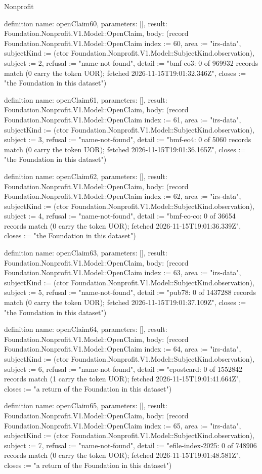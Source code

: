 \begin{lexlean}{Nonprofit}
\begin{semanticmodule}
definition{
  name: openClaim60,
  parameters: [],
  result: Foundation.Nonprofit.V1.Model::OpenClaim,
  body: (record Foundation.Nonprofit.V1.Model::OpenClaim {index := 60, area := "irs-data", subjectKind := (ctor Foundation.Nonprofit.V1.Model::SubjectKind.observation), subject := 2, refusal := "name-not-found", detail := "bmf-eo3: 0 of 969932 records match (0 carry the token UOR); fetched 2026-11-15T19:01:32.346Z", closes := "the Foundation in this dataset"})
}

definition{
  name: openClaim61,
  parameters: [],
  result: Foundation.Nonprofit.V1.Model::OpenClaim,
  body: (record Foundation.Nonprofit.V1.Model::OpenClaim {index := 61, area := "irs-data", subjectKind := (ctor Foundation.Nonprofit.V1.Model::SubjectKind.observation), subject := 3, refusal := "name-not-found", detail := "bmf-eo4: 0 of 5060 records match (0 carry the token UOR); fetched 2026-11-15T19:01:36.165Z", closes := "the Foundation in this dataset"})
}

definition{
  name: openClaim62,
  parameters: [],
  result: Foundation.Nonprofit.V1.Model::OpenClaim,
  body: (record Foundation.Nonprofit.V1.Model::OpenClaim {index := 62, area := "irs-data", subjectKind := (ctor Foundation.Nonprofit.V1.Model::SubjectKind.observation), subject := 4, refusal := "name-not-found", detail := "bmf-eo-co: 0 of 36654 records match (0 carry the token UOR); fetched 2026-11-15T19:01:36.339Z", closes := "the Foundation in this dataset"})
}

definition{
  name: openClaim63,
  parameters: [],
  result: Foundation.Nonprofit.V1.Model::OpenClaim,
  body: (record Foundation.Nonprofit.V1.Model::OpenClaim {index := 63, area := "irs-data", subjectKind := (ctor Foundation.Nonprofit.V1.Model::SubjectKind.observation), subject := 5, refusal := "name-not-found", detail := "pub78: 0 of 1437288 records match (0 carry the token UOR); fetched 2026-11-15T19:01:37.109Z", closes := "the Foundation in this dataset"})
}

definition{
  name: openClaim64,
  parameters: [],
  result: Foundation.Nonprofit.V1.Model::OpenClaim,
  body: (record Foundation.Nonprofit.V1.Model::OpenClaim {index := 64, area := "irs-data", subjectKind := (ctor Foundation.Nonprofit.V1.Model::SubjectKind.observation), subject := 6, refusal := "name-not-found", detail := "epostcard: 0 of 1552842 records match (1 carry the token UOR); fetched 2026-11-15T19:01:41.664Z", closes := "a return of the Foundation in this dataset"})
}

definition{
  name: openClaim65,
  parameters: [],
  result: Foundation.Nonprofit.V1.Model::OpenClaim,
  body: (record Foundation.Nonprofit.V1.Model::OpenClaim {index := 65, area := "irs-data", subjectKind := (ctor Foundation.Nonprofit.V1.Model::SubjectKind.observation), subject := 7, refusal := "name-not-found", detail := "efile-index-2025: 0 of 748906 records match (0 carry the token UOR); fetched 2026-11-15T19:01:48.581Z", closes := "a return of the Foundation in this dataset"})
}


\end{semanticmodule}
\end{lexlean}
